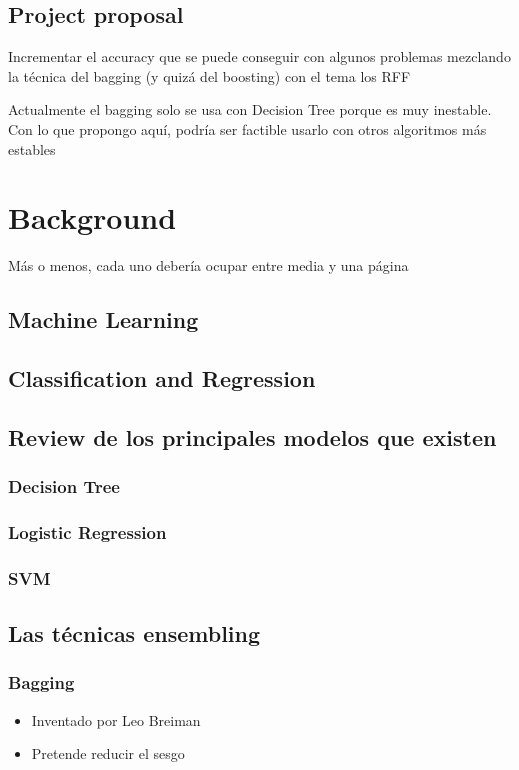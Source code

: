 \documentclass{article}
\begin{document}
\subsection{Project proposal}
Incrementar el accuracy que se puede conseguir con algunos problemas mezclando
la técnica del bagging (y quizá del boosting) con el tema los RFF

Actualmente el bagging solo se usa con Decision Tree porque es muy inestable.
Con lo que propongo aquí, podría ser factible usarlo con otros algoritmos más
estables

\section{Background}
Más o menos, cada uno debería ocupar entre media y una página
\subsection{Machine Learning}
\subsection{Classification and Regression}
\subsection{Review de los principales modelos que existen}
\subsubsection{Decision Tree}
\subsubsection{Logistic Regression}
\subsubsection{SVM}
\subsection{Las técnicas ensembling}
\subsubsection{Bagging}
\begin{itemize}
 \item Inventado por Leo Breiman
 \item Pretende reducir el sesgo
\end{itemize}
\end{document}
